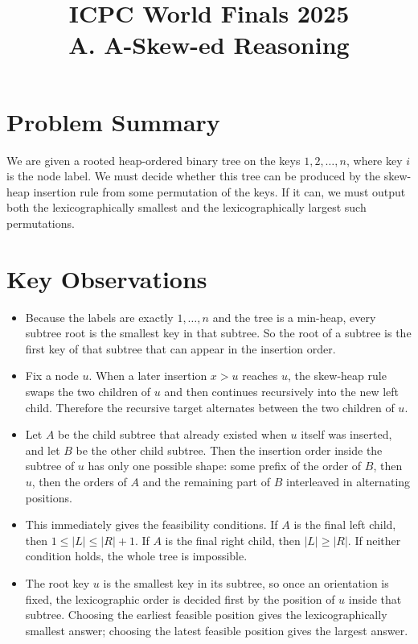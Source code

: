 \documentclass[11pt]{article}
\title{ICPC World Finals 2025\\A. A-Skew-ed Reasoning}
\author{}
\date{}
\begin{document}
\maketitle

\section*{Problem Summary}

We are given a rooted heap-ordered binary tree on the keys $1,2,\dots,n$, where key $i$ is the node
label. We must decide whether this tree can be produced by the skew-heap insertion rule from some
permutation of the keys. If it can, we must output both the lexicographically smallest and the
lexicographically largest such permutations.

\section*{Key Observations}

\begin{itemize}[leftmargin=*]
    \item Because the labels are exactly $1,\dots,n$ and the tree is a min-heap, every subtree root is the
    smallest key in that subtree. So the root of a subtree is the first key of that subtree that can appear
    in the insertion order.
    \item Fix a node $u$. When a later insertion $x>u$ reaches $u$, the skew-heap rule swaps the two
    children of $u$ and then continues recursively into the new left child. Therefore the recursive target
    alternates between the two children of $u$.
    \item Let $A$ be the child subtree that already existed when $u$ itself was inserted, and let $B$ be the
    other child subtree. Then the insertion order inside the subtree of $u$ has only one possible shape:
    some prefix of the order of $B$, then $u$, then the orders of $A$ and the remaining part of $B$
    interleaved in alternating positions.
    \item This immediately gives the feasibility conditions.
    If $A$ is the final left child, then $1 \le |L| \le |R|+1$.
    If $A$ is the final right child, then $|L| \ge |R|$.
    If neither condition holds, the whole tree is impossible.
    \item The root key $u$ is the smallest key in its subtree, so once an orientation is fixed, the
    lexicographic order is decided first by the position of $u$ inside that subtree. Choosing the earliest
    feasible position gives the lexicographically smallest answer; choosing the latest feasible position
    gives the largest answer.
\end{itemize}
\end{document}
